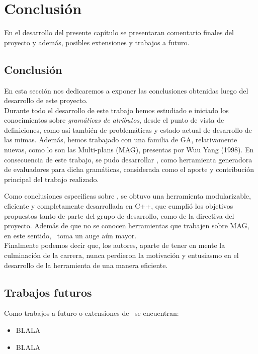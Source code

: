 \chapter{Conclusión}
\label{chap:conclusiones}

\minitoc

En el desarrollo del presente capítulo se presentaran comentario finales del proyecto y además, posibles extensiones y trabajos a futuro.

\section{Conclusión}

En esta sección nos dedicaremos a exponer las conclusiones obtenidas luego del desarrollo de este proyecto.\\

Durante todo el desarrollo de este trabajo hemos estudiado e iniciado los conocimientos sobre \textit{gramáticas de atributos}, desde el punto de vista de definiciones, como así también de problemáticas y estado actual de desarrollo de las mimas. Además, hemos trabajado con una familia de GA, relativamente nuevas, como lo son las Multi-plans (MAG), presentas por Wuu Yang (1998). En consecuencia de este trabajo, se pudo desarrollar \maggen, como herramienta generadora de evaluadores para dicha gramáticas, considerada como el aporte y contribución principal del trabajo realizado.

Como conclusiones especificas sobre \maggen, se obtuvo una herramienta modularizable, eficiente y completamente desarrollada en C++, que cumplió los objetivos propuestos tanto de parte del grupo de desarrollo, como de la directiva del proyecto. Además de que no se conocen herramientas que trabajen sobre MAG, en este sentido, \maggen\ toma un auge aún mayor.\\

Finalmente podemos decir que, los autores, aparte de tener en mente la culminación de la carrera, nunca perdieron la motivación y entusiasmo en el desarrollo de la herramienta de una manera eficiente.

% 

\section{Trabajos futuros}
Como trabajos a futuro o extensiones de \maggen\ se encuentran:
\begin{itemize}
\item BLALA
\item BLALA
\end{itemize}